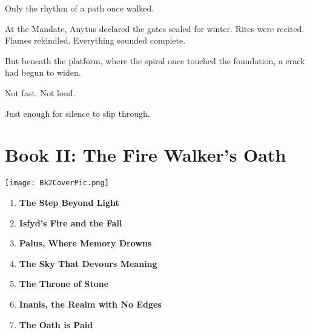 \documentclass[12pt]{article}
\begin{document}
Only the rhythm of a path once walked.

At the Mandate, Anytus declared the gates sealed for winter.  
Rites were recited.  
Flames rekindled.  
Everything sounded complete.

But beneath the platform,  
where the spiral once touched the foundation,  
a crack had begun to widen.

Not fast.  
Not loud.

Just enough  
for silence to slip through.

\newpage

\section{Book II: The Fire Walker's Oath}

\vspace{.5in}

\begin{center}
    \texttt{[image: Bk2CoverPic.png]}
\end{center}

\vspace{.5in}

\begin{enumerate}
    \item \textbf{The Step Beyond Light} 

    \vspace{1em}
    \item \textbf{Isfyd's Fire and the Fall} 

    \vspace{1em}
    \item \textbf{Palus, Where Memory Drowns} 

    \vspace{1em}
    \item \textbf{The Sky That Devours Meaning} 

    \vspace{1em}
    \item \textbf{The Throne of Stone} 

    \vspace{1em}
    \item \textbf{Inanis, the Realm with No Edges}

    \vspace{1em}
    \item \textbf{The Oath is Paid} 

\end{enumerate}
\end{document}
